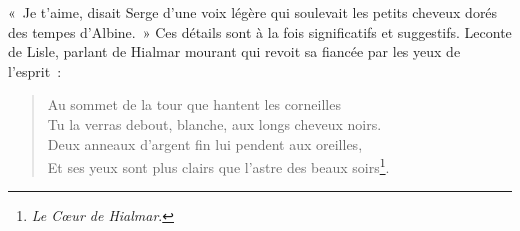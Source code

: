 \documentclass[french,twoside]{book} %
\begin{document}
\noindent « Je t’aime, disait Serge d’une voix légère qui soulevait les petits cheveux dorés des tempes d’Albine. » Ces détails sont à la fois significatifs et suggestifs. Leconte de Lisle, parlant de Hialmar mourant qui revoit sa fiancée par les yeux de l’esprit :\par


\begin{verse}
Au sommet de la tour que hantent les corneilles\\
Tu la verras debout, blanche, aux longs cheveux noirs.\\
Deux anneaux d’argent fin lui pendent aux oreilles,\\
Et ses yeux sont plus clairs que l’astre des beaux soirs\footnote{\emph{Le Cœur de Hialmar}.}.\\
\end{verse}
\end{document}
